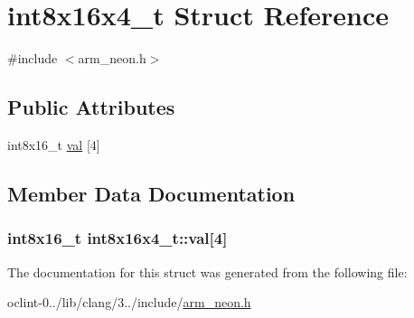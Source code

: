 \hypertarget{structint8x16x4__t}{\section{int8x16x4\-\_\-t Struct Reference}
\label{structint8x16x4__t}
}


{\ttfamily \#include $<$arm\-\_\-neon.\-h$>$}

\subsection*{Public Attributes}
\begin{DoxyCompactItemize}
\item 
int8x16\-\_\-t \hyperlink{structint8x16x4__t_aa064100a392b54c3001a5e4713ee5eb9}{val} \mbox{[}4\mbox{]}
\end{DoxyCompactItemize}


\subsection{Member Data Documentation}
\hypertarget{structint8x16x4__t_aa064100a392b54c3001a5e4713ee5eb9}{
\subsubsection[{val}]{\setlength{\rightskip}{0pt plus 5cm}int8x16\-\_\-t int8x16x4\-\_\-t\-::val\mbox{[}4\mbox{]}}}\label{structint8x16x4__t_aa064100a392b54c3001a5e4713ee5eb9}


The documentation for this struct was generated from the following file\-:\begin{DoxyCompactItemize}
\item 
oclint-\/0../lib/clang/3../include/\hyperlink{arm__neon_8h}{arm\-\_\-neon.\-h}\end{DoxyCompactItemize}
